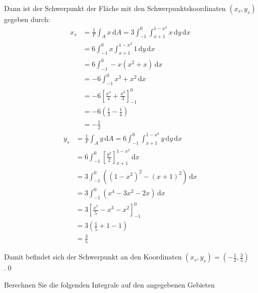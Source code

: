 \documentclass[answers]{exam}
\renewcommand{\d}{\,\mathrm{d}}
\begin{document}
\begin{questions}
\begin{solution}
        Dann ist der Schwerpunkt der Fläche mit den Schwerpunktskoordinaten $(x_s, y_s)$ gegeben durch:
        $$
            \begin{aligned}
                x_s & = \frac{1}{F} \int_A x\d A = 3 \int^0_{-1}  \int^{1-x^2}_{x+1} x \d y \d x \\
                    & = 6 \int^0_{-1} x \int^{1-x^2}_{x+1} 1 \d y \d x                           \\
                    & = 6 \int^0_{-1} -x\left( x^2 + x \right)\d x                               \\
                    & = -6 \int^0_{-1} x^3 + x^2\d x                                             \\
                    & = -6 \left[\frac{x^4}{4} + \frac{x^3}{3}\right]^0_{-1}                     \\
                    & = -6 \left(\frac{1}{3} - \frac{1}{4}\right)                                \\
                    & = -\frac{1}{2}
            \end{aligned}
        $$
        $$
            \begin{aligned}
                y_s & = \frac{1}{F} \int_A y\d A = 6 \int^0_{-1}  \int^{1-x^2}_{x+1} y \d y \d x \\
                    & = 6 \int^0_{-1} \left[\frac{y^2}{2}\right]^{1-x^2}_{x+1} \d x              \\
                    & = 3 \int^0_{-1} \left( (1-x^2)^2 - (x+1)^2\right) \d x                     \\
                    & = 3 \int^0_{-1} \left( x^4-3x^2-2x \right) \d x                            \\
                    & = 3 \left[ \frac{x^5}{5} - x^3 -  x^2 \right]^0_{-1}                       \\
                    & = 3 \left(\frac{1}{5} + 1 - 1\right)                                       \\
                    & = \frac{3}{5}
            \end{aligned}
        $$

        Damit befindet sich der Schwerpunkt an den Koordinaten $(x_s, y_s) = (-\frac{1}{2}, \frac{3}{5})$.\qed
    \end{solution}

    \newpage
    \question
    Berechnen Sie die folgenden Integrale auf den angegebenen Gebieten
\end{questions}
\end{document}
